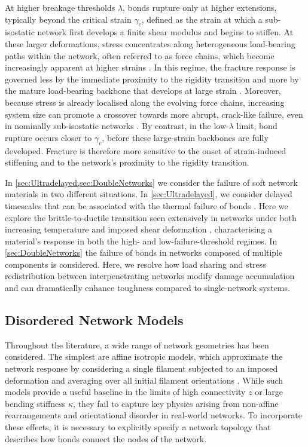 \documentclass[asymmetricmargins]{library/duthesis}%
\begin{document}
At higher breakage thresholds $\lambda$, bonds rupture only at higher extensions, typically beyond the critical strain $\gamma_c$, defined as the strain at which a sub-isostatic network first develops a finite shear modulus and begins to stiffen. At these larger deformations, stress concentrates along heterogeneous load-bearing paths within the network, often referred to as force chains, which become increasingly apparent at higher strains \cite{ruiz-franco_force_2022,Heussinger2007}. In this regime, the fracture response is governed less by the immediate proximity to the rigidity transition and more by the mature load-bearing backbone that develops at large strain \cite{Sarkar2022}. Moreover, because stress is already localised along the evolving force chains, increasing system size can promote a crossover towards more abrupt, crack-like failure, even in nominally sub-isostatic networks \cite{zhang_fiber_2017,driscollRoleRigidityControlling2016,dussi_athermal_2020,tauber_stretchy_2022}. By contrast, in the low-$\lambda$ limit, bond rupture occurs closer to $\gamma_c$, before these large-strain backbones are fully developed. Fracture is therefore more sensitive to the onset of strain-induced stiffening and to the network's proximity to the rigidity transition. 

In \cref{sec:Ultradelayed,sec:DoubleNetworks} we consider the failure of soft network materials in two different situations. In \cref{sec:Ultradelayed}, we consider delayed timescales that can be associated with the thermal failure of bonds \cite{tauber_role_2020,Bullerjahn2014,arruda_three-dimensional_1993,james_theory_1943,Skrzeszewska2010}. Here we explore the brittle-to-ductile transition seen extensively in networks under both increasing temperature and imposed shear deformation \cite{dussi_athermal_2020,ahmedBrittleDuctileTransition2014,ducrot_toughening_2014,tauber_role_2020}, characterising a material's response in both the high- and low-failure-threshold regimes. In \cref{sec:DoubleNetworks} the failure of bonds in networks composed of multiple components is considered. Here, we resolve how load sharing and stress redistribution between interpenetrating networks modify damage accumulation and can dramatically enhance toughness compared to single-network systems.

\subsection{Disordered Network Models} \label{sec:NetworkStructure}
Throughout the literature, a wide range of network geometries has been considered. The simplest are affine isotropic models, which approximate the network response by considering a single filament subjected to an imposed deformation and averaging over all initial filament orientations \cite{mackintosh_elasticity_1995, storm_nonlinear_2005}. While such models provide a useful baseline in the limits of high connectivity $z$ or large bending stiffness $\kappa$, they fail to capture key physics arising from non-affine rearrangements and orientational disorder in real-world networks. To incorporate these effects, it is necessary to explicitly specify a network topology that describes how bonds connect the nodes of the network. 
\end{document}
